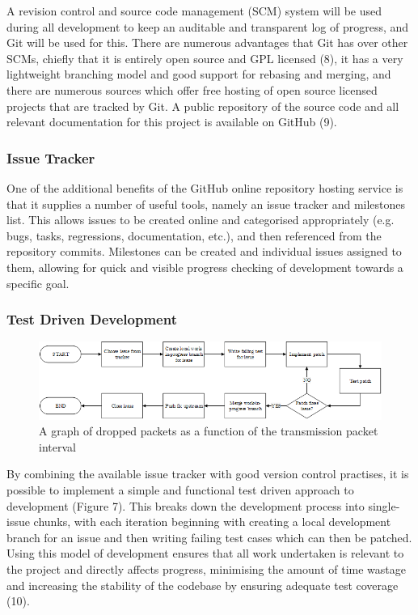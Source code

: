 \documentclass[12pt,a4paper]{article}
\begin{document}
A revision control and source code management (SCM) system will be used during
all development to keep an auditable and transparent log of progress, and Git
will be used for this. There are numerous advantages that Git has over other
SCMs, chiefly that it is entirely open source and GPL licensed (8), it has a
very lightweight branching model and good support for rebasing and merging, and
there are numerous sources which offer free hosting of open source licensed
projects that are tracked by Git. A public repository of the source code and all
relevant documentation for this project is available on GitHub (9).

\subsubsection{Issue Tracker}

One of the additional benefits of the GitHub online repository hosting service
is that it supplies a number of useful tools, namely an issue tracker and
milestones list. This allows issues to be created online and categorised
appropriately (e.g. bugs, tasks, regressions, documentation, etc.), and then
referenced from the repository commits.  Milestones can be created and
individual issues assigned to them, allowing for quick and visible progress
checking of development towards a specific goal.

\subsubsection{Test Driven Development}

\begin{figure}[H]
\centering
\includegraphics{assets/flow-tdd.png}
\caption{A graph of dropped packets as a function of the transmission packet
  interval}
\label{fig:graph-interval-dropped}
\end{figure}

By combining the available issue tracker with good version control practises, it
is possible to implement a simple and functional test driven approach to
development (Figure 7). This breaks down the development process into
single-issue chunks, with each iteration beginning with creating a local
development branch for an issue and then writing failing test cases which can
then be patched. Using this model of development ensures that all work
undertaken is relevant to the project and directly affects progress, minimising
the amount of time wastage and increasing the stability of the codebase by
ensuring adequate test coverage (10).
\end{document}
